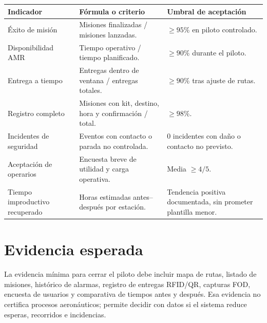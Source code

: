 \begin{longtable}{P{0.28\textwidth}P{0.30\textwidth}P{0.30\textwidth}}
\toprule
\textbf{Indicador} & \textbf{Fórmula o criterio} & \textbf{Umbral de aceptación}\\
\midrule
\endhead
Éxito de misión & Misiones finalizadas / misiones lanzadas. & \(\geq 95\%\) en piloto controlado.\\
Disponibilidad AMR & Tiempo operativo / tiempo planificado. & \(\geq 90\%\) durante el piloto.\\
Entrega a tiempo & Entregas dentro de ventana / entregas totales. & \(\geq 90\%\) tras ajuste de rutas.\\
Registro completo & Misiones con kit, destino, hora y confirmación / total. & \(\geq 98\%\).\\
Incidentes de seguridad & Eventos con contacto o parada no controlada. & 0 incidentes con daño o contacto no previsto.\\
Aceptación de operarios & Encuesta breve de utilidad y carga operativa. & Media \(\geq 4/5\).\\
Tiempo improductivo recuperado & Horas estimadas antes--después por estación. & Tendencia positiva documentada, sin prometer plantilla menor.\\
\bottomrule
\end{longtable}

\section{Evidencia esperada}

La evidencia mínima para cerrar el piloto debe incluir mapa de rutas, listado de misiones, histórico de alarmas, registro de entregas RFID/QR, capturas FOD, encuesta de usuarios y comparativa de tiempos antes y después. Esa evidencia no certifica procesos aeronáuticos; permite decidir con datos si el sistema reduce esperas, recorridos e incidencias.

